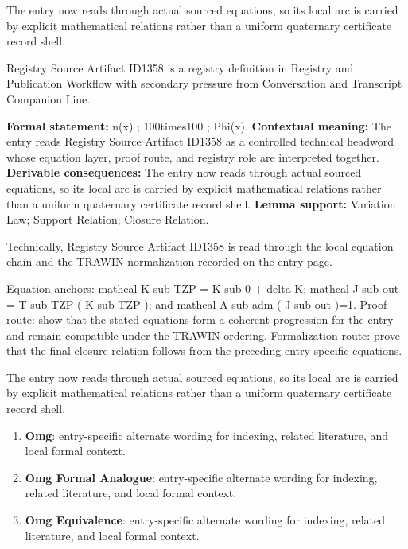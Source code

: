 The entry now reads through actual sourced equations, so its local arc is carried by explicit mathematical relations rather than a uniform quaternary certificate record shell.
\clearpage


\begingroup\small
{}
Registry Source Artifact ID1358 is a registry definition in Registry and Publication Workflow with secondary pressure from Conversation and Transcript Companion Line.

\begingroup\footnotesize\setlength{\emergencystretch}{3em}\sloppy
\textbf{Formal statement:} n(x) ; 100times100 ; Phi(x). \textbf{Contextual meaning:} The entry reads Registry Source Artifact ID1358 as a controlled technical headword whose equation layer, proof route, and registry role are interpreted together. \textbf{Derivable consequences:} The entry now reads through actual sourced equations, so its local arc is carried by explicit mathematical relations rather than a uniform quaternary certificate record shell. \textbf{Lemma support:} Variation Law; Support Relation; Closure Relation.\par
\endgroup

Technically, Registry Source Artifact ID1358 is read through the local equation chain and the TRAWIN normalization recorded on the entry page.

Equation anchors: mathcal K sub TZP = K sub 0 + delta K; mathcal J sub out = T sub TZP ( K sub TZP ); and mathcal A sub adm ( J sub out )=1. Proof route: show that the stated equations form a coherent progression for the entry and remain compatible under the TRAWIN ordering. Formalization route: prove that the final closure relation follows from the preceding entry-specific equations.

The entry now reads through actual sourced equations, so its local arc is carried by explicit mathematical relations rather than a uniform quaternary certificate record shell.
\endgroup

\begin{enumerate}[leftmargin=1.6em,itemsep=6pt,topsep=4pt]
\item \textbf{Omg}: entry-specific alternate wording for indexing, related literature, and local formal context.
\item \textbf{Omg Formal Analogue}: entry-specific alternate wording for indexing, related literature, and local formal context.
\item \textbf{Omg Equivalence}: entry-specific alternate wording for indexing, related literature, and local formal context.
\end{enumerate}

